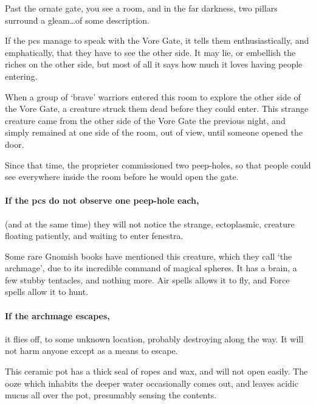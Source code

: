 \begin{boxtext}
  Past the ornate gate, you see a room, and in the far darkness, two pillars surround a gleam\ldots of some description.
\end{boxtext}

If the \glspl{pc} manage to speak with the Vore Gate, it tells them enthusiastically, and emphatically, that they have to see the other side.
It may lie, or embellish the riches on the other side, but most of all it says how much it loves having people entering.

\noindent
\begin{exampletext}
  When a group of `brave' warriors entered this room to explore the other side of the Vore Gate, a creature struck them dead before they could enter.
  This strange creature came from the other side of the Vore Gate the previous night, and simply remained at one side of the room, out of view, until someone opened the door.

  Since that time, the proprieter commissioned two peep-holes, so that people could see everywhere inside the room before he would open the gate.
\end{exampletext}

\paragraph{If the \glspl{pc} do not observe one peep-hole each,}
(and at the same time)
they will not notice the strange, ectoplasmic, creature floating patiently, and waiting to enter \gls{fenestra}.

Some rare Gnomish books have mentioned this creature, which they call `the archmage', due to its incredible command of magical spheres.
It has a brain, a few stubby tentacles, and nothing more.
Air spells allows it to fly, and Force spells allow it to hunt.

\paragraph{If the archmage escapes,}
it flies off, to some unknown location, probably destroying  along the way.
It will not harm anyone except as a means to escape.

\archmage

\showStdSpells


This ceramic pot has a thick seal of ropes and wax, and will not open easily.
The ooze which inhabits the deeper water  occasionally comes out, and leaves acidic mucus all over the pot, presumably sensing the contents.

